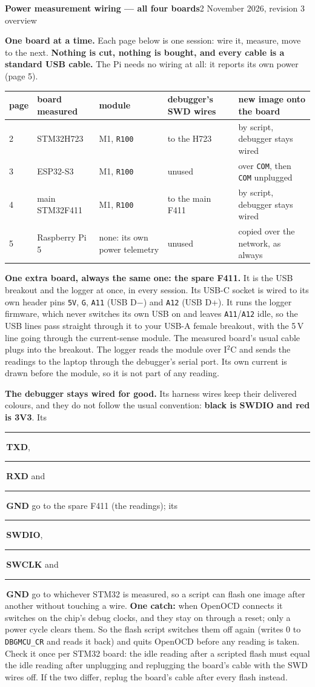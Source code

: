 \documentclass[11pt]{article}
\newcommand{\code}[1]{\texttt{#1}}
\newcommand{\wire}[2]{\textcolor{#1}{\rule[0.25ex]{1.6em}{1.6pt}}\,\textbf{#2}}
\newcommand{\head}[2]{{\Large\bfseries #1}\hfill{\small 2 November 2026, revision 3 \quad #2}\par\smallskip}
\begin{document}
\head{Power measurement wiring --- all four boards}{overview}

\textbf{One board at a time.} Each page below is one session: wire it, measure, move to the next. \textbf{Nothing is
cut, nothing is bought, and every cable is a standard USB cable.} The Pi needs no wiring at all: it reports its own
power (page 5).

\begin{center}
\begin{tabular}{@{}lllll@{}}
\textbf{page} & \textbf{board measured} & \textbf{module} & \textbf{debugger's SWD wires} & \textbf{new image onto the board}\\
\hline
2 & STM32H723 & M1, \code{R100} & to the H723 & by script, debugger stays wired\\
3 & ESP32-S3 & M1, \code{R100} & unused & over \code{COM}, then \code{COM} unplugged\\
4 & main STM32F411 & M1, \code{R100} & to the main F411 & by script, debugger stays wired\\
5 & Raspberry Pi 5 & none: its own power telemetry & unused & copied over the network, as always\\
\end{tabular}
\end{center}

\textbf{One extra board, always the same one: the spare F411.} It is the USB breakout and the logger at once, in every
session. Its USB-C socket is wired to its own header pins \code{5V}, \code{G}, \code{A11} (USB D$-$) and \code{A12}
(USB D+). It runs the logger firmware, which never switches its own USB on and leaves \code{A11}/\code{A12} idle, so the
USB lines pass straight through it to your USB-A female breakout, with the 5\,V line going through the current-sense
module. The measured board's usual cable plugs into the breakout. The logger reads the module over I$^2$C and sends the
readings to the laptop through the debugger's serial port. Its own current is drawn before the module, so it is not
part of any reading.

\textbf{The debugger stays wired for good.} Its harness wires keep their delivered colours, and they do not follow the
usual convention: \textbf{black is SWDIO and red is 3V3}. Its \wire{hOrange}{TXD}, \wire{hPurple}{RXD} and
\wire{hBrown}{GND} go to the spare F411 (the readings); its \wire{hBlack}{SWDIO}, \wire{hYellow}{SWCLK} and
\wire{hTeal}{GND} go to whichever STM32 is measured, so a script can flash one
image after another without touching a wire. \textbf{One catch:} when OpenOCD connects it switches on the chip's debug
clocks, and they stay on through a reset; only a power cycle clears them. So the flash script switches them off again
(writes 0 to \code{DBGMCU\_CR} and reads it back) and quits OpenOCD before any reading is taken. Check it once per STM32
board: the idle reading after a scripted flash must equal the idle reading after unplugging and replugging the board's
cable with the SWD wires off. If the two differ, replug the board's cable after every flash instead.
\end{document}
